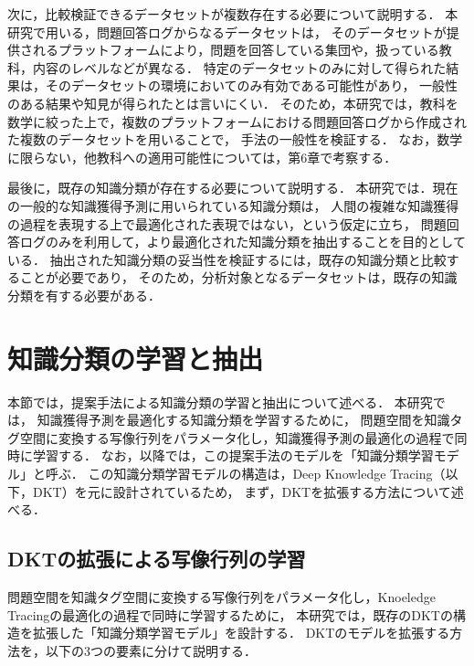 次に，比較検証できるデータセットが複数存在する必要について説明する．
本研究で用いる，問題回答ログからなるデータセットは，
そのデータセットが提供されるプラットフォームにより，問題を回答している集団や，扱っている教科，内容のレベルなどが異なる．
特定のデータセットのみに対して得られた結果は，そのデータセットの環境においてのみ有効である可能性があり，
一般性のある結果や知見が得られたとは言いにくい．
そのため，本研究では，教科を数学に絞った上で，複数のプラットフォームにおける問題回答ログから作成された複数のデータセットを用いることで，
手法の一般性を検証する．
なお，数学に限らない，他教科への適用可能性については，第6章で考察する．


最後に，既存の知識分類が存在する必要について説明する．
本研究では．現在の一般的な知識獲得予測に用いられている知識分類は，
人間の複雑な知識獲得の過程を表現する上で最適化された表現ではない，という仮定に立ち，
問題回答ログのみを利用して，より最適化された知識分類を抽出することを目的としている．
抽出された知識分類の妥当性を検証するには，既存の知識分類と比較することが必要であり，
そのため，分析対象となるデータセットは，既存の知識分類を有する必要がある．





\section{知識分類の学習と抽出}
\label{sec:main}
本節では，提案手法による知識分類の学習と抽出について述べる．
本研究では，
知識獲得予測を最適化する知識分類を学習するために，
問題空間を知識タグ空間に変換する写像行列をパラメータ化し，知識獲得予測の最適化の過程で同時に学習する．
なお，以降では，この提案手法のモデルを「知識分類学習モデル」と呼ぶ．
この知識分類学習モデルの構造は，Deep Knowledge Tracing（以下，DKT）を元に設計されているため，
まず，DKTを拡張する方法について述べる．



\subsection{DKTの拡張による写像行列の学習}
\label{sec:tag_learn}

問題空間を知識タグ空間に変換する写像行列をパラメータ化し，Knoeledge Tracingの最適化の過程で同時に学習するために，
本研究では，既存のDKTの構造を拡張した「知識分類学習モデル」を設計する．
DKTのモデルを拡張する方法を，以下の3つの要素に分けて説明する．


